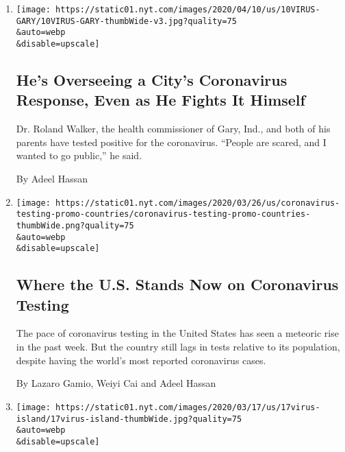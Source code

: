 \begin{enumerate}
\def\labelenumi{\arabic{enumi}.}
\item
  \href{/2020/04/10/us/coronavirus-roland-walker-gary-indiana.html}{}

  \texttt{[image: https://static01.nyt.com/images/2020/04/10/us/10VIRUS-GARY/10VIRUS-GARY-thumbWide-v3.jpg?quality=75\\\&auto=webp\\\&disable=upscale]}

  \hypertarget{hes-overseeing-a-citys-coronavirus-response-even-as-he-fights-it-himself}{%
  \subsection{He's Overseeing a City's Coronavirus Response, Even as He
  Fights It
  Himself}\label{hes-overseeing-a-citys-coronavirus-response-even-as-he-fights-it-himself}}

  Dr. Roland Walker, the health commissioner of Gary, Ind., and both of
  his parents have tested positive for the coronavirus. ``People are
  scared, and I wanted to go public,'' he said.

  By Adeel Hassan
\item
  \href{/interactive/2020/03/26/us/coronavirus-testing-states.html}{}

  \texttt{[image: https://static01.nyt.com/images/2020/03/26/us/coronavirus-testing-promo-countries/coronavirus-testing-promo-countries-thumbWide.png?quality=75\\\&auto=webp\\\&disable=upscale]}

  \hypertarget{where-the-us-stands-now-on-coronavirus-testing}{%
  \subsection{Where the U.S. Stands Now on Coronavirus
  Testing}\label{where-the-us-stands-now-on-coronavirus-testing}}

  The pace of coronavirus testing in the United States has seen a
  meteoric rise in the past week. But the country still lags in tests
  relative to its population, despite having the world's most reported
  coronavirus cases.

  By Lazaro Gamio, Weiyi Cai and Adeel Hassan
\item
  \href{/live/2020/coronavirus-covid-19-03-17/resort-islands-in-the-us-are-barring-outsiders}{}

  \texttt{[image: https://static01.nyt.com/images/2020/03/17/us/17virus-island/17virus-island-thumbWide.jpg?quality=75\\\&auto=webp\\\&disable=upscale]}


\end{enumerate}
